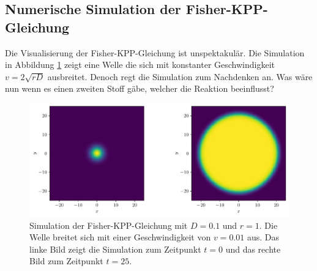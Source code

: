\subsection{Numerische Simulation der Fisher-KPP-Gleichung
\label{reaktdiff:subsection:fkppsimulation}}
Die Visualisierung der Fisher-KPP-Gleichung ist unspektakulär.
Die Simulation in Abbildung \ref{reaktdiff:figure:fisher_kpp_simulation} zeigt eine Welle die sich mit konstanter Geschwindigkeit \(v = 2\sqrt{rD}\) ausbreitet.
Denoch regt die Simulation zum Nachdenken an.
Was wäre nun wenn es einen zweiten Stoff gäbe, welcher die Reaktion beeinflusst?
\begin{figure}
    \centering
    \includegraphics[width=\textwidth]{papers/reaktdiff/images/Fisher_KPP/fisher_kpp_2d_wave_comparison.pdf}
    \caption{Simulation der Fisher-KPP-Gleichung mit \(D = 0.1\) und \(r = 1\). Die Welle breitet sich mit einer Geschwindigkeit von \(v = 0.01\) aus. Das linke Bild zeigt die Simulation zum Zeitpunkt \(t = 0\) und das rechte Bild zum Zeitpunkt \(t = 25\).}
    \label{reaktdiff:figure:fisher_kpp_simulation}
\end{figure}